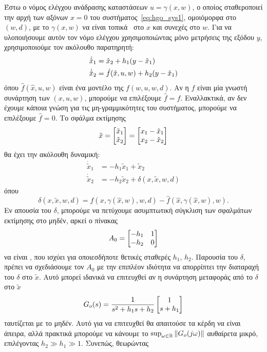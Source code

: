 Έστω ο νόμος ελέγχου ανάδρασης καταστάσεων $u = \gamma(x,w)$, ο οποίος σταθεροποιεί την αρχή των αξόνων $x = 0$ του συστήματος~\eqref{eq:hgo_sys1}, ομοιόμορφα στο $(w,d)$, με το $\gamma(x,w)$ να είναι τοπικά \lip\ στο $x$ και συνεχές στο $w$. Για να υλοποιήσουμε αυτόν τον νόμο ελέγχου χρησιμοποιώντας μόνο μετρήσεις της εξόδου $y$, χρησιμοποιούμε τον ακόλουθο παρατηρητή:
\begin{equation}
    \label{eq:hgo observer structure}          
    \begin{split}
        \dot{\hat{x}}_1 &= \hat x_2 + h_1 \pqty{y - \hat x_1}\\
        \dot{\hat{x}}_2 &= \hat f(\hat{x}, u, w) + h_2(y -\hat x_1)
    \end{split}
\end{equation}
όπου $\hat f(\hat{x}, u, w)$ είναι ένα μοντέλο της $f(w, u, w, d)$. Αν η $f$ είναι μία γνωστή συνάρτηση των $(x,u, w)$, μπορούμε να επιλέξουμε $\hat f = f$. Εναλλακτικά, αν δεν έχουμε κάποια γνώση για τις μη-γραμμικότητες του συστήματος, μπορούμε να επιλέξουμε $\hat f =0$. Tο σφάλμα εκτίμησης
\[
    \tilde x = \bmqty{\tilde{x}_1\\\tilde{x}_2}
             = \bmqty{x_1 - \hat x_1\\ x_2 - \hat x_2}
\]
θα έχει την ακόλουθη δυναμική:
\begin{equation}
    \label{eq:hgo estimation error dynamics}
    \begin{split}
        \dot{\tilde{x}}_1 &= -h_1 \tilde{x}_1 + \tilde x_2\\
        \dot{\tilde{x}}_2 &= -h_2 \tilde{x}_2 + \delta(x, \tilde x, w, d)
    \end{split}
\end{equation}
όπου
\[
    \delta(x, \tilde x, w, d) = f(x, \gamma(\hat x, w), w, d) - \hat f(\hat x, \gamma(\hat x, w), w).
\]
Εν απουσία του $\delta$, μπορούμε να πετύχουμε ασυμπτωτική σύγκλιση των σφαλμάτων εκτίμησης στο μηδέν, αρκεί ο πίνακας
\[
   A_0 = \bmqty{-h_1 & 1 \\ -h_2 &0}
\]
να είναι \hur, που ισχύει για οποιεσδήποτε θετικές σταθερές $h_1$, $h_2$. Παρουσία του $\delta$, πρέπει να σχεδιάσουμε τον $A_0$ με την επιπλέον ιδιότητα να απορρίπτει την διαταραχή του $\delta$ στο $\tilde x$. Αυτό μπορεί ιδανικά να επιτευχθεί αν η συνάρτηση μεταφοράς από το $\delta$ στο $\tilde x$
\[
    G_o(s) = \frac{1}{s^2 + h_1 s + h_2} \bmqty{1 \\ s + h_1}
\]
ταυτίζεται με το μηδέν. Αυτό για να επιτευχθεί θα απαιτούσε τα κέρδη να είναι άπειρα, αλλά πρακτικά μπορούμε να κάνουμε το $\sup_{\omega \in \mathbb{R}} \norm{G_o(j \omega)}$ αυθαίρετα μικρό, επιλέγοντας $h_2 \gg h_1 \gg 1$. Συνεπώς, θεωρώντας
